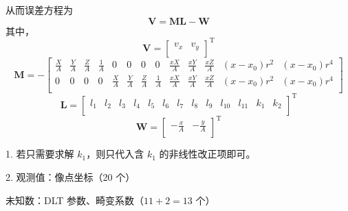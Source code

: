 \documentclass[a4paper]{ctexart}
\newtheorem*{sol}{\hskip 2em 解}
\newtheorem*{tips}{\hskip 2em 注}
\begin{document}
\begin{sol}
从而误差方程为
$$
\bm{V=ML-W}
$$
其中，
$$
\boldsymbol{V}=\left[ \begin{matrix}
	v_x&		v_y\\
\end{matrix} \right] ^{\mathrm{T}}
$$
$$
\boldsymbol{M}=-\left[ \begin{matrix}
	\frac{X}{A}&		\frac{Y}{A}&		\frac{Z}{A}&		\frac{1}{A}&		0&		0&		0&		0&		\frac{xX}{A}&		\frac{xY}{A}&		\frac{xZ}{A}&		\left( x-x_0 \right) r^2&		\left( x-x_0 \right) r^4\\
	0&		0&		0&		0&		\frac{X}{A}&		\frac{Y}{A}&		\frac{Z}{A}&		\frac{1}{A}&		\frac{xX}{A}&		\frac{xY}{A}&		\frac{xZ}{A}&		\left( x-x_0 \right) r^2&		\left( x-x_0 \right) r^4\\
\end{matrix} \right] 
$$
$$
\boldsymbol{L}=\left[ \begin{matrix}
	l_1&		l_2&		l_3&		l_4&		l_5&		l_6&		l_7&		l_8&		l_9&		l_{10}&		l_{11}&		k_1&		k_2\\
\end{matrix} \right] ^{\mathrm{T}}
$$
$$
\boldsymbol{W}=\left[ \begin{matrix}
	-\frac{x}{A}&		-\frac{y}{A}\\
\end{matrix} \right] ^{\mathrm{T}}
$$
\end{sol}
\begin{tips}
1. 若只需要求解 $k_1$，则只代入含 $k_1$ 的非线性改正项即可。

2. 观测值：像点坐标（20 个）

未知数：DLT 参数、畸变系数（$11+2=13$ 个）
\end{tips}
\newpage
\end{document}

